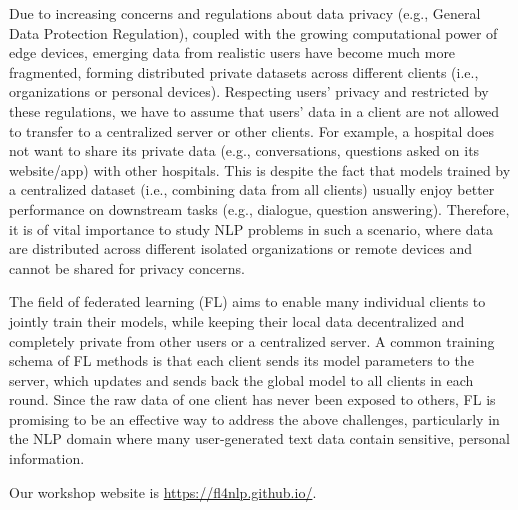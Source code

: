 Due to increasing concerns and regulations about data privacy (e.g., General Data Protection Regulation), coupled with the growing computational power of edge devices, emerging data from realistic users have become much more fragmented, forming distributed private datasets across different clients (i.e., organizations or personal devices). Respecting users’ privacy and restricted by these regulations, we have to assume that users’ data in a client are not allowed to transfer to a centralized server or other clients. For example, a hospital does not want to share its private data (e.g., conversations, questions asked on its website/app) with other hospitals. This is despite the fact that models trained by a centralized dataset (i.e., combining data from all clients) usually enjoy better performance on downstream tasks (e.g., dialogue, question answering). Therefore, it is of vital importance to study NLP problems in such a scenario, where data are distributed across different isolated organizations or remote devices and cannot be shared for privacy concerns.

The field of federated learning (FL) aims to enable many individual clients to jointly train their models, while keeping their local data decentralized and completely private from other users or a centralized server. A common training schema of FL methods is that each client sends its model parameters to the server, which updates and sends back the global model to all clients in each round. Since the raw data of one client has never been exposed to others, FL is promising to be an effective way to address the above challenges, particularly in the NLP domain where many user-generated text data contain sensitive, personal information.


Our workshop website is \url{https://fl4nlp.github.io/}.